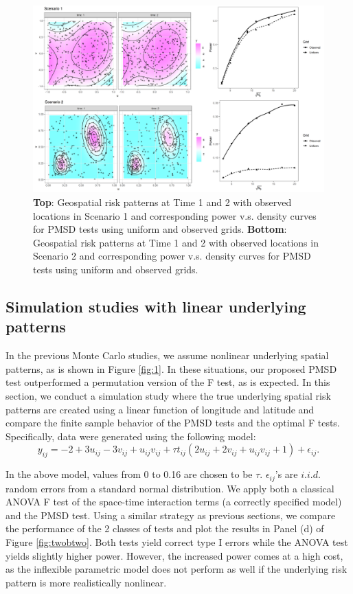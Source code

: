 	\begin{figure}[h] 
		\centering
		\includegraphics[width=\linewidth]{Figures/Chap3/gridc1234SNR.png}
		\caption{\textbf{Top}: Geospatial risk patterns at Time 1 and 2 with observed locations in Scenario 1 and corresponding power v.s. density curves for PMSD tests using uniform and observed grids. \textbf{Bottom}: Geospatial risk patterns at Time 1 and 2 with observed locations in Scenario 2 and corresponding power v.s. density curves for PMSD tests using uniform and observed grids.}
		\label{fig:simuV2}
	\end{figure}
	
	\subsection{Simulation studies with linear underlying patterns}
	
	In the previous Monte Carlo studies, we assume nonlinear underlying spatial patterns, as is shown in Figure \ref{fig:1}. In these situations, our proposed PMSD test outperformed a permutation version of the F test, as is expected. In this section, we conduct a simulation study where the true underlying spatial risk patterns are created using a linear function of longitude and latitude and compare the finite sample behavior of the PMSD tests and the optimal F tests.  Specifically, data were generated using the following model:
	\begin{equation}
	y_{ij}=-2+3u_{ij}-3v_{ij}+u_{ij}v_{ij}+\tau t_{ij}(2u_{ij}+2v_{ij}+u_{ij}v_{ij}+1)+\epsilon_{ij}.
	\label{eq:paratruth}
	\end{equation}
	
	In the above model, values from 0 to 0.16 are chosen to be $\tau$. $\epsilon_{ij}$'s are $i.i.d.$ random errors from a standard normal distribution. We apply both a classical ANOVA F test of the space-time interaction terms (a correctly specified model) and the PMSD test. Using a similar strategy as previous sections, we compare the performance of the 2 classes of tests and plot the results in Panel (d) of Figure \ref{fig:twobtwo}. Both tests yield correct type I errors while the ANOVA test yields slightly higher power. However, the increased power comes at a high cost, as the inflexible parametric model does not perform as well if the underlying risk pattern is more realistically nonlinear.
	
